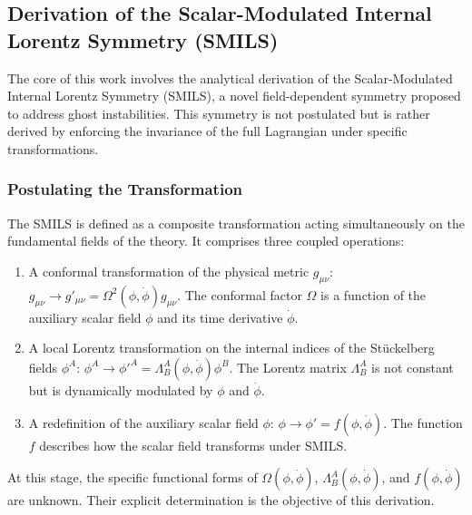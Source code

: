 \documentclass[twocolumn]{aastex631}
\begin{document}
\subsection{Derivation of the Scalar-Modulated Internal Lorentz Symmetry (SMILS)}
The core of this work involves the analytical derivation of the Scalar-Modulated Internal Lorentz Symmetry (SMILS), a novel field-dependent symmetry proposed to address ghost instabilities. This symmetry is not postulated but is rather derived by enforcing the invariance of the full Lagrangian under specific transformations.

\subsubsection{Postulating the Transformation}
The SMILS is defined as a composite transformation acting simultaneously on the fundamental fields of the theory. It comprises three coupled operations:
\begin{enumerate}
    \item A conformal transformation of the physical metric $g_{\mu\nu}$: $g_{\mu\nu} \rightarrow g'_{\mu\nu} = \Omega^2(\phi, \dot{\phi}) g_{\mu\nu}$. The conformal factor $\Omega$ is a function of the auxiliary scalar field $\phi$ and its time derivative $\dot{\phi}$.
    \item A local Lorentz transformation on the internal indices of the Stückelberg fields $\phi^A$: $\phi^A \rightarrow \phi'^A = \Lambda^A_B(\phi, \dot{\phi}) \phi^B$. The Lorentz matrix $\Lambda^A_B$ is not constant but is dynamically modulated by $\phi$ and $\dot{\phi}$.
    \item A redefinition of the auxiliary scalar field $\phi$: $\phi \rightarrow \phi' = f(\phi, \dot{\phi})$. The function $f$ describes how the scalar field transforms under SMILS.
\end{enumerate}
At this stage, the specific functional forms of $\Omega(\phi, \dot{\phi})$, $\Lambda^A_B(\phi, \dot{\phi})$, and $f(\phi, \dot{\phi})$ are unknown. Their explicit determination is the objective of this derivation.
\end{document}
